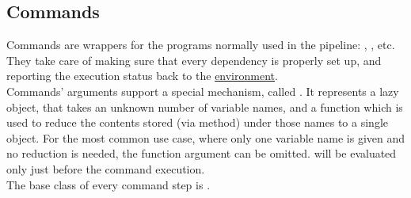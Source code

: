 \subsection{Commands}\label{subsec:steps_commands}
    Commands are wrappers for the programs normally used in the pipeline: , , etc.
    They take care of making sure that every dependency is properly set up, and reporting the execution status back to
    the \hyperref[sec:environments]{environment}.\\

    Commands' arguments support a special mechanism, called
     \label{sec:DependentExpr} .
    It represents a lazy object, that takes an unknown number of variable names, and a function which is used to
    reduce the contents stored (via \hyperref[sec:set_variable]{} method)
    under those names to a single object.
    For the most common use case, where only one variable name is given and no reduction is needed, the function
    argument can be omitted.
     will be evaluated only just before the command execution.\\

    The base class of every command step is .

\subsection*{}\label{subsec:CommandBase}

